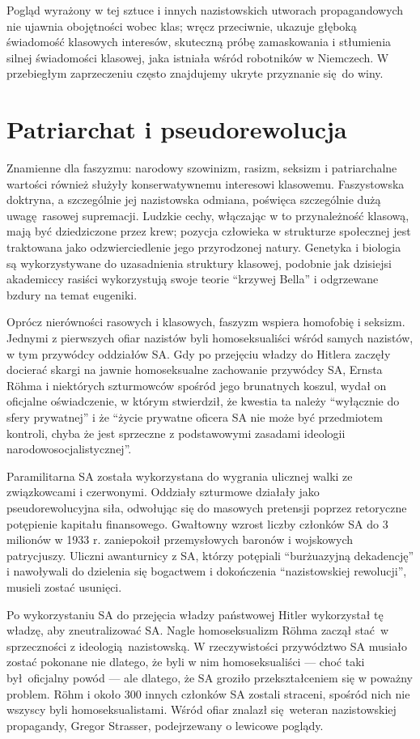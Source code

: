\documentclass[12pt]{book}
\newcommand{\sekcja}[1]{
  \addcontentsline{toc}{section}{#1}
  \section*{#1}
}
\begin{document}
Pogląd wyrażony w tej sztuce i innych nazistowskich utworach propagandowych nie ujawnia obojętności wobec klas; wręcz przeciwnie, ukazuje głęboką świadomość klasowych interesów, skuteczną próbę zamaskowania i stłumienia silnej świadomości klasowej, jaka istniała wśród robotników w Niemczech. W przebiegłym zaprzeczeniu często znajdujemy ukryte przyznanie się do winy.

\sekcja{Patriarchat i pseudorewolucja}
Znamienne dla faszyzmu: narodowy szowinizm, rasizm, seksizm i patriarchalne wartości również służyły konserwatywnemu interesowi klasowemu. Faszystowska doktryna, a szczególnie jej nazistowska odmiana, poświęca szczególnie dużą uwagę rasowej supremacji. Ludzkie cechy, włączając w to przynależność klasową, mają być dziedziczone przez krew; pozycja człowieka w strukturze społecznej jest traktowana jako odzwierciedlenie jego przyrodzonej natury. Genetyka i biologia są wykorzystywane do uzasadnienia struktury klasowej, podobnie jak dzisiejsi akademiccy rasiści wykorzystują swoje teorie ``krzywej Bella'' i odgrzewane bzdury na temat eugeniki.

Oprócz nierówności rasowych i klasowych, faszyzm wspiera homofobię i seksizm. Jednymi z pierwszych ofiar nazistów byli homoseksualiści wśród samych nazistów, w tym przywódcy oddziałów SA. Gdy po przejęciu władzy do Hitlera zaczęły docierać skargi na jawnie homoseksualne zachowanie przywódcy SA, Ernsta Röhma i niektórych szturmowców spośród jego brunatnych koszul, wydał on oficjalne oświadczenie, w którym stwierdził, że kwestia ta należy ``wyłącznie do sfery prywatnej'' i że ``życie prywatne oficera SA nie może być przedmiotem kontroli, chyba że jest sprzeczne z podstawowymi zasadami ideologii narodowosocjalistycznej''.

Paramilitarna SA została wykorzystana do wygrania ulicznej walki ze związkowcami i czerwonymi. Oddziały szturmowe działały jako pseudorewolucyjna siła, odwołując się do masowych pretensji poprzez retoryczne potępienie kapitału finansowego. Gwałtowny wzrost liczby członków SA do 3 milionów w 1933 r. zaniepokoił przemysłowych baronów i wojskowych patrycjuszy. Uliczni awanturnicy z SA, którzy potępiali ``burżuazyjną dekadencję'' i nawoływali do dzielenia się bogactwem i dokończenia ``nazistowskiej rewolucji'', musieli zostać usunięci.

Po wykorzystaniu SA do przejęcia władzy państwowej Hitler wykorzystał tę władzę, aby zneutralizować SA. Nagle homoseksualizm Röhma zaczął stać w sprzeczności z ideologią nazistowską. W rzeczywistości przywództwo SA musiało zostać pokonane nie dlatego, że byli w nim homoseksualiści — choć taki był oficjalny powód — ale dlatego, że SA groziło przekształceniem się w poważny problem. Röhm i około 300 innych członków SA zostali straceni, spośród nich nie wszyscy byli homoseksualistami. Wśród ofiar znalazł się weteran nazistowskiej propagandy, Gregor Strasser, podejrzewany o lewicowe poglądy.
\end{document}

